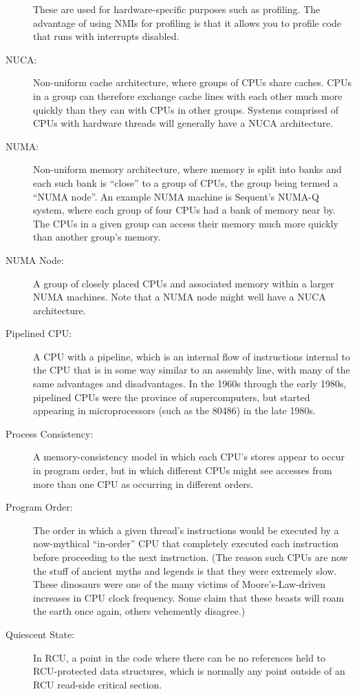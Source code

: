 \begin{description}
	These are used for hardware-specific purposes such as profiling.
	The advantage of using NMIs for profiling is that it allows you
	to profile code that runs with interrupts disabled.
\item[NUCA:]
	Non-uniform cache architecture, where groups of CPUs share
	caches.
	CPUs in a group can therefore exchange cache lines with each
	other much more quickly than they can with CPUs in other groups.
	Systems comprised of CPUs with hardware threads will generally
	have a NUCA architecture.
\item[NUMA:]
	Non-uniform memory architecture, where memory is split into
	banks and each such bank is ``close'' to a group of CPUs,
	the group being termed a ``NUMA node''.
	An example NUMA machine is Sequent's NUMA-Q system, where
	each group of four CPUs had a bank of memory near by.
	The CPUs in a given group can access their memory much
	more quickly than another group's memory.
\item[NUMA Node:]
	A group of closely placed CPUs and associated memory within
	a larger NUMA machines.
	Note that a NUMA node might well have a NUCA architecture.
\item[Pipelined CPU:]
	A CPU with a pipeline, which is
	an internal flow of instructions internal to the CPU that
	is in some way similar to an assembly line, with many of
	the same advantages and disadvantages.
	In the 1960s through the early 1980s, pipelined CPUs were the
	province of supercomputers, but started appearing in microprocessors
	(such as the 80486) in the late 1980s.
\item[Process Consistency:]
	A memory-consistency model in which each CPU's stores appear to
	occur in program order, but in which different CPUs might see
	accesses from more than one CPU as occurring in different orders.
\item[Program Order:]
	The order in which a given thread's instructions
	would be executed by a now-mythical ``in-order'' CPU that
	completely executed each instruction before proceeding to
	the next instruction.
	(The reason such CPUs are now the stuff of ancient myths
	and legends is that they were extremely slow.
	These dinosaurs were one of the many victims of
	Moore's-Law-driven increases in CPU clock frequency.
	Some claim that these beasts will roam the earth once again,
	others vehemently disagree.)
\item[Quiescent State:]
	In RCU, a point in the code where there can be no references held
	to RCU-protected data structures, which is normally any point
	outside of an RCU read-side critical section.

\end{description}
